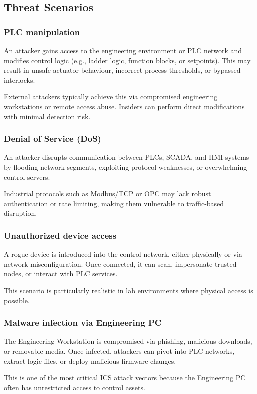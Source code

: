 \subsection{Threat Scenarios}

\subsubsection{PLC manipulation}
An attacker gains access to the engineering environment or PLC network and modifies control logic (e.g., ladder logic, function blocks, or setpoints). This may result in unsafe actuator behaviour, incorrect process thresholds, or bypassed interlocks.

External attackers typically achieve this via compromised engineering workstations or remote access abuse. Insiders can perform direct modifications with minimal detection risk.

\subsubsection{Denial of Service (DoS)}
An attacker disrupts communication between PLCs, SCADA, and HMI systems by flooding network segments, exploiting protocol weaknesses, or overwhelming control servers.

Industrial protocols such as Modbus/TCP or OPC may lack robust authentication or rate limiting, making them vulnerable to traffic-based disruption.

\subsubsection{Unauthorized device access}
A rogue device is introduced into the control network, either physically or via network misconfiguration. Once connected, it can scan, impersonate trusted nodes, or interact with PLC services.

This scenario is particularly realistic in lab environments where physical access is possible.

\subsubsection{Malware infection via Engineering PC}
The Engineering Workstation is compromised via phishing, malicious downloads, or removable media. Once infected, attackers can pivot into PLC networks, extract logic files, or deploy malicious firmware changes.

This is one of the most critical ICS attack vectors because the Engineering PC often has unrestricted access to control assets.

